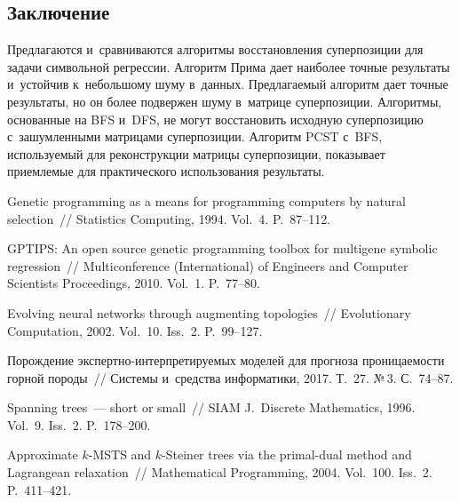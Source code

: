 \begin{multicols}{2}
\vspace*{-9pt}

\section{Заключение}

\vspace*{-3pt}

Предлагаются и~сравниваются  алгоритмы вос\-ста\-нов\-ле\-ния суперпозиции для задачи 
символьной регрессии. Алгоритм Прима дает наиболее точ\-ные результаты и~устойчив 
к~небольшому шуму в~данных. Пред\-ла\-га\-емый алгоритм дает точные результаты, но он 
более подвержен шуму в~мат\-ри\-це суперпозиции. Алгоритмы, основанные на BFS и~DFS, 
не могут вос\-ста\-но\-вить исходную суперпозицию с~зашумленными мат\-ри\-ца\-ми 
суперпозиции. Алгоритм PCST с~BFS, используемый для реконструкции мат\-ри\-цы 
суперпозиции, показывает приемлемые для практического использования результаты.

{\small\frenchspacing
 {%
 \begin{thebibliography}{99}
 Genetic programming as a means for programming computers by 
natural selection~// Statistics Computing, 1994. Vol.~4. P.~87--112.

 GPTIPS: An open source 
genetic programming toolbox for multigene  symbolic regression~// 
Multiconference (International) of Engineers and Computer Scientists Proceedings, 
2010. Vol.~1. P.~77--80.

 Evolving neural networks through 
augmenting topologies~// Evolutionary Computation, 2002. Vol.~10. 
Iss.~2. P.~99--127.

 Порождение экс\-перт\-но-ин\-тер\-пре\-ти\-ру\-емых 
моделей для прогноза проницаемости горной породы~// Системы и~средства информатики, 2017. Т.~27. №\,3. С.~74--87.
%

Spanning trees~--- short or small~// SIAM J.~Discrete Mathematics, 
1996. Vol.~9. Iss.~2. P.~178--200.

 Approximate $k$-MSTS 
and $k$-Steiner trees via the primal-dual method and Lagrangean 
relaxation~// Mathematical Programming, 2004. Vol.~100. Iss.~2. P.~411--421.


\end{thebibliography}}}
\end{multicols}
